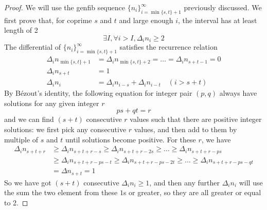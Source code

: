 \documentclass[]{article}
\begin{document}
\begin{proof}
	We will use the genfib sequence $\{n_i\}_{i=\min\{s,t\}+1}^{\infty}$ previously discussed. We first prove that, for coprime $s$ and $t$ and large enough $i$, the interval has at least length of 2
	\[
	\exists I, \forall i>I, \Delta_i n_{i} \ge 2
	\]
	The differential of $\{n_i\}_{i=\min\{s,t\}+1}^{\infty}$ satisfies the recurrence relation
	\begin{align*}
	\Delta_i n_{\min\{s,t\}+1} &= \Delta_i n_{\min\{s,t\}+2} = \dots = \Delta_i n_{s+t-1} = 0\\
	\Delta_i n_{s+t} &= 1\\
	\Delta_i n_i &= \Delta_i n_{i-s} + \Delta_i n_{i-t} \quad (i > s + t)
	\end{align*}
	By Bézout's identity, the following equation for integer pair $(p, q)$ always have solutions for any given integer $r$
	\[
	ps + qt = r
	\]
	and we can find $(s + t)$ consecutive $r$ values such that there are positive integer solutions: we first pick any consecutive $r$ values, and then add to them by multiple of $s$ and $t$ until solutions become positive. For these $r$, we have
	\begin{align*}
	\Delta_i n_{s+t+r} &\geq \Delta_i n_{s+t+r - s} \geq \Delta_i n_{s+t+r - 2s} \geq\dots \geq \Delta_i  n_{s+t+r - ps} \\
		&\geq \Delta_i n_{s+t+r - ps - t} \geq \Delta_i n_{s+t+r - ps - 2t} \geq\dots \geq \Delta_i  n_{s+t+r - ps - qt} \\
		&= \Delta n_{s+t} = 1
	\end{align*}
	So we have got $(s + t)$ consecutive $\Delta_i n_i\geq 1$, and then any further $\Delta_i n_i$ will use the sum the two element from these $1$s or greater, so they are all greater or equal to 2.


\end{proof}
\end{document}
